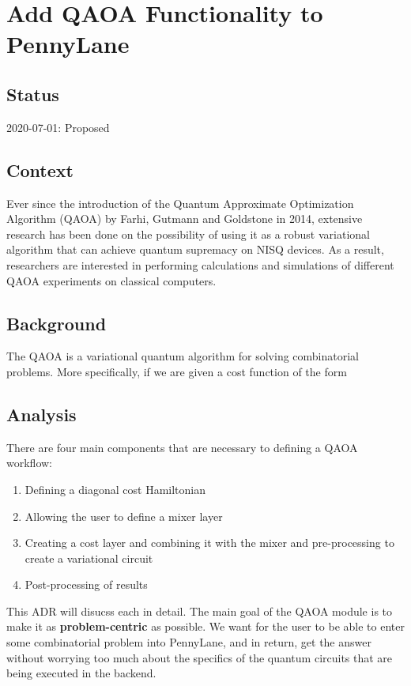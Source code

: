 \documentclass{article}
\begin{document}
\section{Add QAOA Functionality to PennyLane}

\subsection{Status}

2020-07-01: Proposed

\subsection{Context}

Ever since the introduction of the Quantum Approximate Optimization Algorithm (QAOA) 
by Farhi, Gutmann and Goldstone in 2014, extensive research 
has been done on the possibility of using it as a robust variational algorithm that can 
achieve quantum supremacy on NISQ devices. As 
a result, researchers are interested in performing calculations and simulations of different 
QAOA experiments on classical computers.

\subsection{Background}

The QAOA is a variational quantum algorithm for solving combinatorial problems. More specifically, 
if we are given a cost function of the form

\subsection{Analysis}

There are four main components that are necessary to defining a QAOA workflow:

\begin{enumerate}
	\item Defining a diagonal cost Hamiltonian
	\item Allowing the user to define a mixer layer
	\item Creating a cost layer and combining it with the mixer and pre-processing 
	      to create a variational circuit
      	\item Post-processing of results 
\end{enumerate}
\noindent
This ADR will disucss each in detail.
\newline\newline
The main goal of the QAOA module is to make it as \textbf{problem-centric} as possible. 
We want for the user to be able to enter some combinatorial problem into PennyLane, and 
in return, get the answer without worrying too much about the specifics of the quantum 
circuits that are being executed in the backend.
\end{document}
